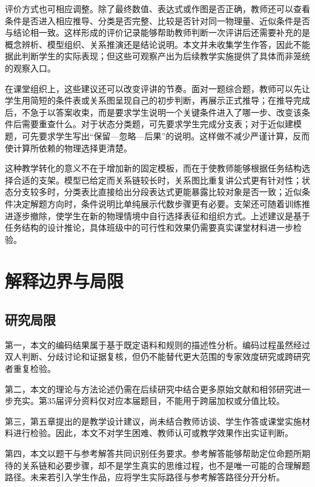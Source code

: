 \documentclass[
  12pt,
  a4paper]{ctexbook}
\begin{document}
评价方式也可相应调整。除了最终数值、表达式或作图是否正确，教师还可以查看条件是否进入相应推导、分类是否完整、比较是否针对同一物理量、近似条件是否与结论相一致。这样形成的评价记录能够帮助教师判断一次评讲后还需要补充的是概念辨析、模型组织、关系推演还是结论说明。本文并未收集学生作答，因此不能据此判断学生的实际表现；但这些可观察产出为后续教学实施提供了具体而非笼统的观察入口。

在课堂组织上，这些建议还可以改变评讲的节奏。面对一题综合题，教师可以先让学生用简短的条件表或关系图呈现自己的初步判断，再展示正式推导；在推导完成后，不急于以答案收束，而是要求学生说明一个关键条件进入了哪一步、改变该条件后需要重查什么。对于状态分类题，可先要求学生完成分支表；对于近似建模题，可先要求学生写出``保留---忽略---后果''的说明。这样做不减少严谨计算，反而使计算所依赖的物理选择更清楚。

这种教学转化的意义不在于增加新的固定模板，而在于使教师能够根据任务结构选择合适的支架。模型已给定而关系链较长时，关系图比重复讲公式更有针对性；状态分支较多时，分类表比直接给出分段表达式更能暴露比较对象是否一致；近似条件决定解题方向时，条件说明比单纯展示代数步骤更有必要。支架还可随着训练推进逐步撤除，使学生在新的物理情境中自行选择表征和组织方式。上述建议是基于任务结构的设计推论，具体班级中的可行性和效果仍需要真实课堂材料进一步检验。

\section{解释边界与局限}\label{ux89e3ux91caux8fb9ux754cux4e0eux5c40ux9650}

\subsection{研究局限}\label{ux7814ux7a76ux5c40ux9650}

第一，本文的编码结果属于基于既定语料和规则的描述性分析。编码过程虽然经过双人判断、分歧讨论和证据复核，但仍不能替代更大范围的专家效度研究或跨研究者重复检验。

第二，本文的理论与方法论述仍需在后续研究中结合更多原始文献和相邻研究进一步充实。第35届评分资料仅对应本届题目，不能用于跨届加权或分值比较。

第三，第五章提出的是教学设计建议，尚未结合教师访谈、学生作答或课堂实施材料进行检验。因此，本文不对学生困难、教师认可或教学效果作出实证判断。

第四，本文以题干与参考解答共同识别任务要求。参考解答能够帮助定位命题所期待的关系链和必要步骤，却不是学生真实的思维过程，也不是唯一可能的合理解题路径。未来若引入学生作品，应将学生实际路径与参考解答路径分开分析。
\end{document}
